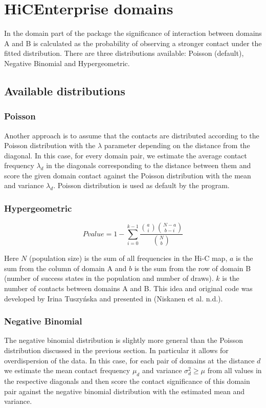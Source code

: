 \chapter{HiCEnterprise domains}
\label{domains}

In the domain part of the package the significance of interaction between domains A and B is calculated as the
probability of observing a stronger contact under the fitted distribution. There are three distributions available:
Poisson (default), Negative Binomial and Hypergeometric.

\section{Available distributions}

\subsection{Poisson}
Another approach is to assume that the contacts are distributed according to the Poisson distribution with the $\lambda$ parameter depending on the distance from the diagonal. In this case, for every domain pair, we estimate the average contact frequency $\lambda_d$ in the diagonals corresponding to the distance between them and score the given domain contact against the Poisson distribution with the mean and variance $\lambda_d$. Poisson distribution is used as default by the program.

\subsection{Hypergeometric}

\begin{equation}
Pvalue = 1 - \sum_{i=0}^{k-1} \frac{{a\choose i}{N-a\choose b-i }}{{N\choose b}}
\end{equation}

Here $N$ (population size) is the sum of all frequencies in the Hi-C map, $a$ is the sum from the column of domain A and
$b$ is the sum from the row of domain B (number of success states in the population and number of draws). $k$ is the number of contacts between domains A and B. This idea
and original code was developed by Irina Tuszyńska and presented in (Niskanen et al. n.d.).

\subsection{Negative Binomial}
The negative binomial distribution is slightly more general than the Poisson distribution discussed in the previous section. In particular it allows for overdispersion of the data. In this case, for each pair of domains at the distance $d$ we estimate the mean contact frequency $\mu_d$ and variance $\sigma^2_d \geq \mu$ from all values in the respective diagonals and then score the contact significance of this domain pair against the negative binomial distribution with the estimated mean and variance. 

